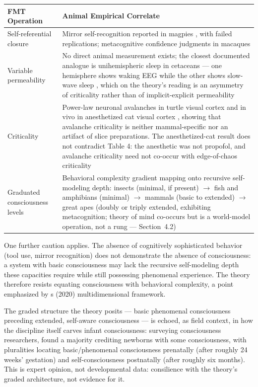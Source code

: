 \documentclass[12pt]{article}
\newcommand{\revstart}{}
\newcommand{\revend}{}
\begin{document}
\begin{table}[H]
\centering
\small
\begin{tabularx}{\textwidth}{lX}
\toprule
\textbf{FMT Operation} & \textbf{Animal Empirical Correlate} \\
\midrule
Self-referential closure & Mirror self-recognition reported in magpies \citep{Prior2008}, with failed replications; metacognitive confidence judgments in macaques \citep{Hampton2001} \\
Variable permeability & No direct animal measurement exists; the closest documented analogue is unihemispheric sleep in cetaceans --- one hemisphere shows waking EEG while the other shows slow-wave sleep \citep{Mukhametov1977}, which on the theory's reading is an asymmetry of criticality rather than of implicit-explicit permeability \\
Criticality & Power-law neuronal avalanches in turtle visual cortex \citep{Shew2015} and in vivo in anesthetized cat visual cortex \citep{Hahn2010}, showing that avalanche criticality is neither mammal-specific nor an artifact of slice preparations. The anesthetized-cat result does not contradict Table 4: the anesthetic was not propofol, and avalanche criticality need not co-occur with edge-of-chaos criticality \citep{Kanders2017} \\
Graduated consciousness levels & Behavioral complexity gradient mapping onto recursive self-modeling depth: insects (minimal, if present) $\rightarrow$ fish and amphibians (minimal) $\rightarrow$ mammals (basic to extended) $\rightarrow$ great apes (doubly or triply extended, exhibiting metacognition; theory of mind co-occurs but is a world-model operation, not a rung --- Section~4.2) \\
\bottomrule
\end{tabularx}
\end{table}

One further caution applies. The absence of cognitively sophisticated behavior (tool use, mirror recognition) does not demonstrate the absence of consciousness: a system with basic consciousness may lack the recursive self-modeling depth these capacities require while still possessing phenomenal experience. The theory therefore resists equating consciousness with behavioral complexity, a point emphasized by \citeauthor{BirchSchnellClayton2020}\textquotesingle s (2020) multidimensional framework.

{\revstart The graded structure the theory posits --- basic phenomenal consciousness preceding extended, self-aware consciousness --- is echoed, as field context, in how the discipline itself carves infant consciousness: surveying consciousness researchers, \citet{PassosFerreiraChalmers2026} found a majority crediting newborns with some consciousness, with pluralities locating basic/phenomenal consciousness prenatally (after roughly 24 weeks' gestation) and self-consciousness postnatally (after roughly six months). This is expert opinion, not developmental data: consilience with the theory's graded architecture, not evidence for it.\revend}
\end{document}
